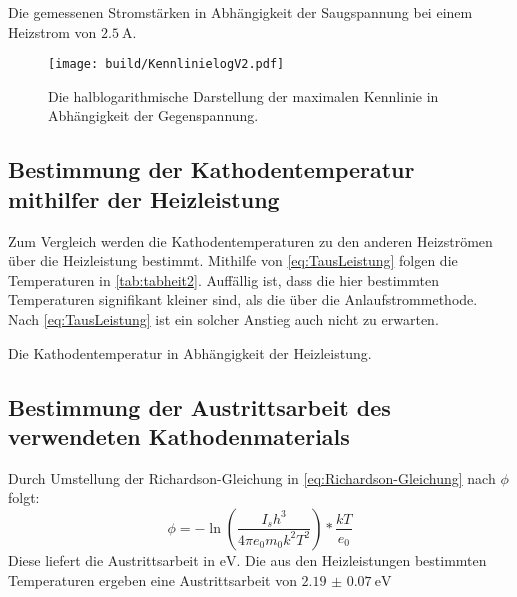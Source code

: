  \begin{table}
  \centering
  \caption{Die gemessenen Stromstärken in Abhängigkeit der Saugspannung bei einem Heizstrom von $\SI{2,5}{\ampere}$.}
  
  \label{tab:tabV2}
 \end{table}

 \begin{figure}
  \centering
  \caption{Die halblogarithmische Darstellung der maximalen Kennlinie in Abhängigkeit der Gegenspannung.}
  \texttt{[image: build/KennlinielogV2.pdf]}
  \label{fig:Graphlog3}
 \end{figure}

\subsection{Bestimmung der Kathodentemperatur mithilfer der Heizleistung}
Zum Vergleich werden die Kathodentemperaturen zu den anderen Heizströmen über die Heizleistung bestimmt.
Mithilfe von \ref{eq:TausLeistung} folgen die Temperaturen in \ref{tab:tabheit2}.
Auffällig ist, dass die hier bestimmten Temperaturen signifikant kleiner sind,
als die über die Anlaufstrommethode. Nach \ref{eq:TausLeistung} ist ein solcher Anstieg auch nicht zu erwarten.

\begin{table}
 \centering
 \caption{Die Kathodentemperatur in Abhängigkeit der Heizleistung.}
 
 \label{tab:tabheit2}
\end{table}

\subsection{Bestimmung der Austrittsarbeit des verwendeten Kathodenmaterials}
Durch Umstellung der Richardson-Gleichung in \ref{eq:Richardson-Gleichung} nach
$\phi$ folgt:
\begin{equation}
  \phi = -\ln\left(\frac{I_s h^3}{4\pi e_0 m_0 k^2 T^2}\right)*\frac{k T}{e_0}
\end{equation}
Diese liefert die Austrittsarbeit in $\si{\electronvolt}$. Die aus den Heizleistungen
bestimmten Temperaturen ergeben eine Austrittsarbeit von $\SI{2.19(7)}{\electronvolt}$
